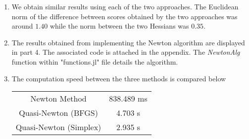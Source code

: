 \documentclass[landscape]{article} %
\theoremstyle{definition}
\begin{document}
\begin{enumerate}

	\item We obtain similar results using each of the two approaches. The Euclidean norm of the difference between scores obtained by the two approaches was around $ 1.40$ while the norm between the two Hessians was $ 0.35 $.
	
	
	\item The results obtained from implementing the Newton algorithm are displayed in part 4. The associated code is attached in the appendix. The \textit{NewtonAlg} function within  "functions.jl" file details the algorithm.
	
	
	\item  The computation speed between the three methods is compared below
	\begin{table}[H]
		\centering
		\begin{tabular}{c c }
			\hline
			Newton Method & 838.489 ms\\
			Quasi-Newton (BFGS) & 4.703 s\\
			Quasi-Newton (Simplex) & 2.935 s\\\hline
		\end{tabular}
	\end{table}
	

\end{enumerate}
\end{document}
